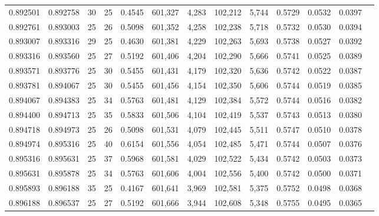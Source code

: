 \begin{tabular}{rrrrrrrrrrrrr}
0.892501 & 0.892758 &    30 &  25 &                                     0.4545 & 601,327 &   4,283 & 102,212 &   5,744 & 0.5729 & 0.0532 & 0.0397 \\
0.892761 & 0.893003 &    25 &  26 &                                     0.5098 & 601,352 &   4,258 & 102,238 &   5,718 & 0.5732 & 0.0530 & 0.0394 \\
0.893007 & 0.893316 &    29 &  25 &                                     0.4630 & 601,381 &   4,229 & 102,263 &   5,693 & 0.5738 & 0.0527 & 0.0392 \\
0.893316 & 0.893560 &    25 &  27 &                                     0.5192 & 601,406 &   4,204 & 102,290 &   5,666 & 0.5741 & 0.0525 & 0.0389 \\
0.893571 & 0.893776 &    25 &  30 &                                     0.5455 & 601,431 &   4,179 & 102,320 &   5,636 & 0.5742 & 0.0522 & 0.0387 \\
0.893781 & 0.894067 &    25 &  30 &                                     0.5455 & 601,456 &   4,154 & 102,350 &   5,606 & 0.5744 & 0.0519 & 0.0385 \\
0.894067 & 0.894383 &    25 &  34 &                                     0.5763 & 601,481 &   4,129 & 102,384 &   5,572 & 0.5744 & 0.0516 & 0.0382 \\
0.894400 & 0.894713 &    25 &  35 &                                     0.5833 & 601,506 &   4,104 & 102,419 &   5,537 & 0.5743 & 0.0513 & 0.0380 \\
0.894718 & 0.894973 &    25 &  26 &                                     0.5098 & 601,531 &   4,079 & 102,445 &   5,511 & 0.5747 & 0.0510 & 0.0378 \\
0.894974 & 0.895316 &    25 &  40 &                                     0.6154 & 601,556 &   4,054 & 102,485 &   5,471 & 0.5744 & 0.0507 & 0.0376 \\
0.895316 & 0.895631 &    25 &  37 &                                     0.5968 & 601,581 &   4,029 & 102,522 &   5,434 & 0.5742 & 0.0503 & 0.0373 \\
0.895631 & 0.895878 &    25 &  34 &                                     0.5763 & 601,606 &   4,004 & 102,556 &   5,400 & 0.5742 & 0.0500 & 0.0371 \\
0.895893 & 0.896188 &    35 &  25 &                                     0.4167 & 601,641 &   3,969 & 102,581 &   5,375 & 0.5752 & 0.0498 & 0.0368 \\
0.896188 & 0.896537 &    25 &  27 &                                     0.5192 & 601,666 &   3,944 & 102,608 &   5,348 & 0.5755 & 0.0495 & 0.0365 \\

\end{tabular}
